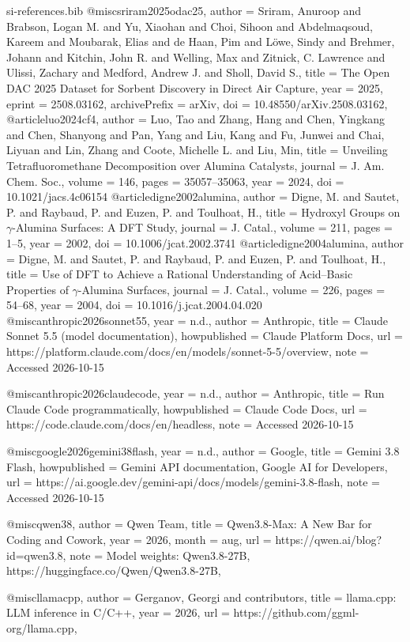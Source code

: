 \begin{filecontents*}[overwrite]{si-references.bib}
@misc{sriram2025odac25,
  author = {Sriram, Anuroop and Brabson, Logan M. and Yu, Xiaohan and Choi, Sihoon and Abdelmaqsoud, Kareem and Moubarak, Elias and de Haan, Pim and L{\"o}we, Sindy and Brehmer, Johann and Kitchin, John R. and Welling, Max and Zitnick, C. Lawrence and Ulissi, Zachary and Medford, Andrew J. and Sholl, David S.},
  title = {The Open DAC 2025 Dataset for Sorbent Discovery in Direct Air Capture},
  year = {2025},
  eprint = {2508.03162},
  archivePrefix = {arXiv},
  doi = {10.48550/arXiv.2508.03162},
}
@article{luo2024cf4,
  author = {Luo, Tao and Zhang, Hang and Chen, Yingkang and Chen, Shanyong and Pan, Yang and Liu, Kang and Fu, Junwei and Chai, Liyuan and Lin, Zhang and Coote, Michelle L. and Liu, Min},
  title = {Unveiling Tetrafluoromethane Decomposition over Alumina Catalysts},
  journal = {J. Am. Chem. Soc.},
  volume = {146},
  pages = {35057--35063},
  year = {2024},
  doi = {10.1021/jacs.4c06154}
}
@article{digne2002alumina,
  author = {Digne, M. and Sautet, P. and Raybaud, P. and Euzen, P. and Toulhoat, H.},
  title = {Hydroxyl Groups on $\gamma$-Alumina Surfaces: A {DFT} Study},
  journal = {J. Catal.},
  volume = {211},
  pages = {1--5},
  year = {2002},
  doi = {10.1006/jcat.2002.3741}
}
@article{digne2004alumina,
  author = {Digne, M. and Sautet, P. and Raybaud, P. and Euzen, P. and Toulhoat, H.},
  title = {Use of {DFT} to Achieve a Rational Understanding of Acid--Basic Properties of $\gamma$-Alumina Surfaces},
  journal = {J. Catal.},
  volume = {226},
  pages = {54--68},
  year = {2004},
  doi = {10.1016/j.jcat.2004.04.020}
}
@misc{anthropic2026sonnet55,
  year = {n.d.},
  author = {{Anthropic}},
  title = {Claude Sonnet 5.5 (model documentation)},
  howpublished = {Claude Platform Docs},
  url = {https://platform.claude.com/docs/en/models/sonnet-5-5/overview},
  note = {Accessed 2026-10-15}
}

@misc{anthropic2026claudecode,
  year = {n.d.},
  author = {{Anthropic}},
  title = {Run Claude Code programmatically},
  howpublished = {Claude Code Docs},
  url = {https://code.claude.com/docs/en/headless},
  note = {Accessed 2026-10-15}
}

@misc{google2026gemini38flash,
  year = {n.d.},
  author = {{Google}},
  title = {Gemini 3.8 Flash},
  howpublished = {Gemini API documentation, Google AI for Developers},
  url = {https://ai.google.dev/gemini-api/docs/models/gemini-3.8-flash},
  note = {Accessed 2026-10-15}
}

@misc{qwen38,
  author = {{Qwen Team}},
  title = {{Qwen3.8-Max}: A New Bar for Coding and Cowork},
  year = {2026},
  month = aug,
  url = {https://qwen.ai/blog?id=qwen3.8},
  note = {Model weights: Qwen3.8-27B, https://huggingface.co/Qwen/Qwen3.8-27B},
}

@misc{llamacpp,
  author = {Gerganov, Georgi and {contributors}},
  title = {llama.cpp: {LLM} inference in {C/C++}},
  year = {2026},
  url = {https://github.com/ggml-org/llama.cpp},
}
\end{filecontents*}

